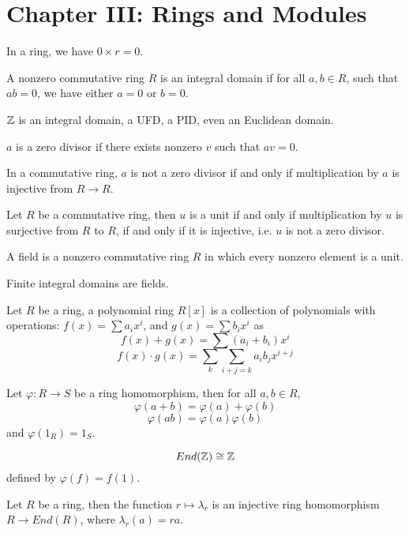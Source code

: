 \section{Chapter III: Rings and Modules}
In a ring, we have $0\times r=0$.
\begin{defn}
    A nonzero commutative ring $R$ is an integral domain if for all $a,b\in R$, such that $ab=0$, we have either $a=0$ or $b=0$.
\end{defn}
\begin{warn}
    $\mathbb{Z}$ is an integral domain, a UFD, a PID, even an Euclidean domain.
\end{warn}
\begin{defn}
    $a$ is a zero divisor if there exists nonzero $v$ such that $av=0$.
\end{defn}
\begin{prop}
    In a commutative ring, $a$ is not a zero divisor if and only if multiplication by $a$ is injective from $R\to R$.
\end{prop}
\begin{prop}
    Let $R$ be a commutative ring, then $u$ is a unit if and only if multiplication by $u$ is surjective from $R$ to $R$, if and only if it is injective, i.e. $u$ is not a zero divisor.
\end{prop}
\begin{defn}[field]
    A field is a nonzero commutative ring $R$ in which every nonzero element is a unit.
\end{defn}
\begin{thm}
    Finite integral domains are fields.
\end{thm}
\begin{defn}
    Let $R$ be a ring, a polynomial ring $R[x]$ is a collection of polynomials with operations:
    $f(x)=\sum a_ix^i$, and $g(x)=\sum b_ix^i$ as
    \begin{equation*}
        f(x)+g(x)=\sum(a_i+b_i)x^i
    \end{equation*}
    \begin{equation*}
        f(x)\cdot g(x)=\sum_{k}\sum_{i+j=k}a_ib_jx^{i+j}
    \end{equation*}
\end{defn}
\begin{defn}
    Let $\varphi:R\to S$ be a ring homomorphism, then for all $a,b\in R$, 
    \begin{equation*}
        \varphi(a+b)=\varphi(a)+\varphi(b)
    \end{equation*}
    \begin{equation*}
        \varphi(ab)=\varphi(a)\varphi(b)
    \end{equation*}
    and $\varphi(1_R)=1_S$.
\end{defn}
\begin{prop}
    \begin{equation*}
        End(\mathbb{Z})\cong \mathbb{Z}
    \end{equation*}
    defined by $\varphi(f)=f(1)$.
\end{prop}
\begin{prop}
    Let $R$ be a ring, then the function $r\mapsto\lambda_r$ is an injective ring homomorphism $R\to End(R)$, where $\lambda_r(a)=ra$.
\end{prop}
